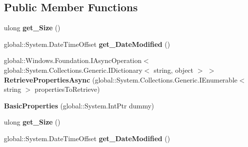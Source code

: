 \subsection*{Public Member Functions}
\begin{DoxyCompactItemize}
\item 
\mbox{\label{class_windows_1_1_storage_1_1_file_properties_1_1_basic_properties_a990d0f7166669cc5c3a28b4c051a5f29}} 
ulong {\bfseries get\+\_\+\+Size} ()
\item 
\mbox{\label{class_windows_1_1_storage_1_1_file_properties_1_1_basic_properties_a32ef3325f757258938c74274c8d9a2ad}} 
global\+::\+System.\+Date\+Time\+Offset {\bfseries get\+\_\+\+Date\+Modified} ()
\item 
\mbox{\label{class_windows_1_1_storage_1_1_file_properties_1_1_basic_properties_a0e64ae79604ba053bcdbe1e537e3f2a7}} 
global\+::\+Windows.\+Foundation.\+I\+Async\+Operation$<$ global\+::\+System.\+Collections.\+Generic.\+I\+Dictionary$<$ string, object $>$ $>$ {\bfseries Retrieve\+Properties\+Async} (global\+::\+System.\+Collections.\+Generic.\+I\+Enumerable$<$ string $>$ properties\+To\+Retrieve)
\item 
\mbox{\label{class_windows_1_1_storage_1_1_file_properties_1_1_basic_properties_a1e59bb5e98b3bdb808833a68eab07f9e}} 
{\bfseries Basic\+Properties} (global\+::\+System.\+Int\+Ptr dummy)
\item 
\mbox{\label{class_windows_1_1_storage_1_1_file_properties_1_1_basic_properties_a990d0f7166669cc5c3a28b4c051a5f29}} 
ulong {\bfseries get\+\_\+\+Size} ()
\item 
\mbox{\label{class_windows_1_1_storage_1_1_file_properties_1_1_basic_properties_a32ef3325f757258938c74274c8d9a2ad}} 
global\+::\+System.\+Date\+Time\+Offset {\bfseries get\+\_\+\+Date\+Modified} ()
\item 
\mbox{\label{class_windows_1_1_storage_1_1_file_properties_1_1_basic_properties_a0e64ae79604ba053bcdbe1e537e3f2a7}} 

\end{DoxyCompactItemize}
